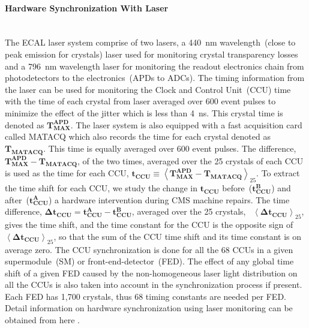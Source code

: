 \paragraph{Hardware Synchronization With Laser}\mbox{}\\
The ECAL laser system comprise of two lasers, a 440~nm wavelength~(close to peak emission for \pb crystals) laser used for monitoring crystal transparency losses and a 796~nm wavelength laser for monitoring the readout electronics chain from photodetectors to the electronics~(\ie APDs to ADCs). The timing information from the laser can be used for monitoring the Clock and Control Unit~(CCU) time with the time of each crystal from laser averaged over 600 event pulses to minimize the effect of the jitter which is less than 4~ns. This crystal time is denoted as $\mathbf{T^{APD}_{MAX}}$. The laser system is also equipped with a fast acquisition card called MATACQ which also records the time for each crystal denoted as $\mathbf{T_{MATACQ}}$. This time is equally averaged over 600 event pulses.
The difference, $ \mathbf{T^{APD}_{MAX}} - \mathbf{T_{MATACQ}}$, of the two times, averaged over the  25 crystals of each CCU is used as the time for each CCU, \ie $\mathbf{t_{CCU}} \equiv \left\langle \mathbf{T^{APD}_{MAX} - T_{MATACQ}} \right\rangle_{25} $. 
To extract the time shift for each CCU, we study the change in $\mathbf{t_{CCU}}$ before~($\mathbf{t^{B}_{CCU}} $) and after~($\mathbf{t^{A}_{CCU}} $) a hardware intervention during CMS machine repairs.  
The time difference, $\mathbf{\Delta t_{CCU}} = \mathbf{t^{A}_{CCU} - t^{B}_{CCU}}$, averaged over the 25 crystals, \ie ~$\left\langle \mathbf{\Delta t_{CCU}} \right\rangle_{25}$, gives the time shift, and the time constant for the CCU is the opposite sign of $\left\langle \mathbf{\Delta t_{CCU}} \right\rangle_{25} $, so that the sum of the CCU time shift and its time constant is on average zero. The CCU synchronization is done for all the 68 CCUs in a given supermodule~(SM) or front-end-detector~(FED). The effect of any global time shift of a given FED caused by the non-homogeneous laser light distribution on all the CCUs is also taken into account in the synchronization process if present. Each FED has 1,700 \pb crystals, thus 68 timing constants are needed per FED. Detail information on hardware synchronization using laser monitoring can be obtained from here \cite{ECALHW}.
